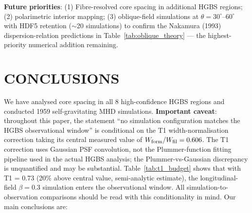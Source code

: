 \documentclass[twoside,twocolumn]{mnras}
\begin{document}
\textbf{Future priorities}: (1) Fibre-resolved core spacing in additional HGBS regions; (2) polarimetric interior mapping; (3) oblique-field simulations at $\theta = 30^\circ$--$60^\circ$ with HDF5 retention ($\sim$20 simulations) to confirm the Nakamura (1993) dispersion-relation predictions in Table~\ref{tab:oblique_theory} --- the highest-priority numerical addition remaining.

\section{CONCLUSIONS}

We have analysed core spacing in all 8 high-confidence HGBS regions and conducted
1959 self-gravitating MHD simulations. \textbf{Important caveat}: throughout this
paper, the statement ``no simulation configuration matches the HGBS observational
window'' is conditional on the T1 width-normalisation correction taking its central
measured value of $W_{\rm form}/W_{\rm fil} = 0.606$. The T1 correction uses Gaussian
PSF convolution, not the Plummer-function fitting pipeline used in the actual HGBS
analysis; the Plummer-vs-Gaussian discrepancy is unquantified and may be substantial.
Table~\ref{tab:t1_budget} shows that with T1 = 0.73 (20\% above central value, semi-analytic estimate), the longitudinal-field $\beta = 0.3$ simulation enters the observational window. All
simulation-to-observation comparisons should be read with this conditionality in mind.
Our main conclusions are:
\end{document}
